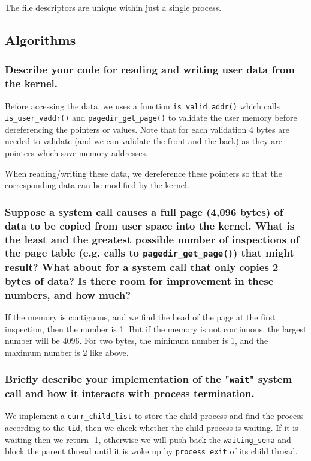 \documentclass[sigconf, nonacm, balance=false, urlbreakonhyphens=true]{acmart}
\begin{document}
            The file descriptors are unique within just a single process. 

        \subsection{Algorithms}

            \subsubsection{Describe your code for reading and writing user data from the kernel. } 
            
            Before accessing the data, we uses a function \texttt{is\_valid\_addr()} which calls \texttt{is\_user\_vaddr()} and \texttt{pagedir\_get\_page()} to validate the user memory before dereferencing the pointers or values. Note that for each validation 4 bytes are needed to validate (and we can validate the front and the back) as they are pointers which save memory addresses. 
            
            When reading/writing these data, we dereference these pointers so that the corresponding data can be modified by the kernel. 

            \subsubsection{Suppose a system call causes a full page (4,096 bytes) of data to be copied from user space into the kernel.  What is the least and the greatest possible number of inspections of the page table (e.g. calls to \texttt{pagedir\_get\_page()}) that might result?  What about for a system call that only copies 2 bytes of data?  Is there room for improvement in these numbers, and how much?}
            
            If the memory is contiguous, and we find the head of the page at the first inspection, then the number is 1. But if the memory is not continuous, the largest number will be 4096. For two bytes, the minimum number is 1, and the maximum number is 2 like above. 

            \subsubsection{Briefly describe your implementation of the "\texttt{wait}" system call and how it interacts with process termination. }
            
            We implement a \texttt{curr\_child\_list} to store the child process and find the process according to the \texttt{tid}, then we check whether the child process is waiting. If it is waiting then we return -1, otherwise we will push back the \texttt{waiting\_sema} and block the parent thread until it is woke up by \texttt{process\_exit} of its child thread.
            
\end{document}
